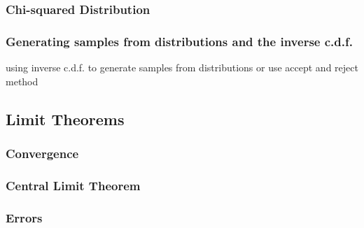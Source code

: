 \documentclass[12pt,a4paper]{article}
\begin{document}
\subsubsection{Chi-squared Distribution}
\subsubsection{Generating samples from distributions and the inverse c.d.f.}
using inverse c.d.f. to generate samples from distributions
or use accept and reject method
\subsection{Limit Theorems}
\subsubsection{Convergence}
\subsubsection{Central Limit Theorem}
\subsubsection{Errors}
\end{document}
